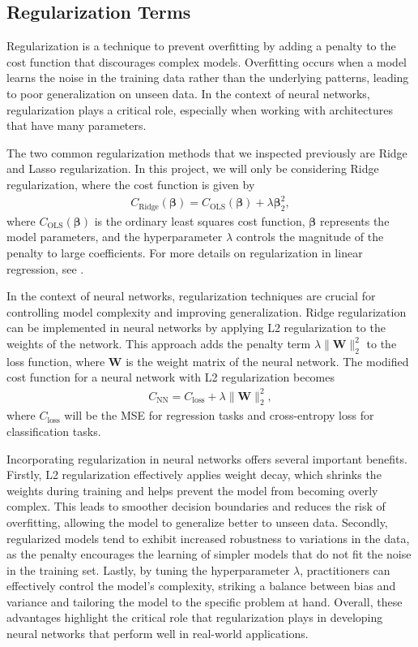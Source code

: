 \documentclass[%
reprint,s
amsmath,amssymb,
aps,
]{revtex4-2}
\begin{document}
\subsection{Regularization Terms}
Regularization is a technique to prevent overfitting by adding a penalty to the cost function that discourages complex models. Overfitting occurs when a model learns the noise in the training data rather than the underlying patterns, leading to poor generalization on unseen data. In the context of neural networks, regularization plays a critical role, especially when working with architectures that have many parameters.

The two common regularization methods that we inspected previously are Ridge and Lasso regularization. In this project, we will only be considering Ridge regularization, where the cost function is given by
\begin{align}
	C_\text{Ridge}(\bm \beta)=C_\text{OLS}(\bm\beta)+\lambda\bm\beta_2^2,
\end{align}
where \(C_\text{OLS}(\bm\beta)\) is the ordinary least squares cost function, \(\bm\beta\) represents the model parameters, and the hyperparameter \(\lambda\) controls the magnitude of the penalty to large coefficients. For more details on regularization in linear regression, see \cite{project1}.

In the context of neural networks, regularization techniques are crucial for controlling model complexity and improving generalization. Ridge regularization can be implemented in neural networks by applying L2 regularization to the weights of the network. This approach adds the penalty term \( \lambda \|\mathbf{W}\|_2^2 \) to the loss function, where \( \mathbf{W} \) is the weight matrix of the neural network. The modified cost function for a neural network with L2 regularization becomes
\begin{align}
	C_{\text{NN}}=C_{\text{loss}}+\lambda \|\mathbf{W}\|_2^2,
\end{align}
where \( C_{\text{loss}} \) will be the MSE for regression tasks and cross-entropy loss for classification tasks.

Incorporating regularization in neural networks offers several important benefits. Firstly, L2 regularization effectively applies weight decay, which shrinks the weights during training and helps prevent the model from becoming overly complex. This leads to smoother decision boundaries and reduces the risk of overfitting, allowing the model to generalize better to unseen data. Secondly, regularized models tend to exhibit increased robustness to variations in the data, as the penalty encourages the learning of simpler models that do not fit the noise in the training set. Lastly, by tuning the hyperparameter \( \lambda \), practitioners can effectively control the model's complexity, striking a balance between bias and variance and tailoring the model to the specific problem at hand. Overall, these advantages highlight the critical role that regularization plays in developing neural networks that perform well in real-world applications.
\end{document}
